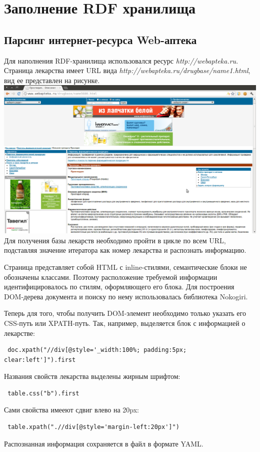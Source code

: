 \documentclass[specialist,subf,href,colorlinks=true
]{disser}
\begin{document}
\chapter{Заполнение RDF хранилища}
\section{Парсинг интернет-ресурса Web-аптека}
Для наполнения RDF-хранилища использовался ресурс \textit{http://webapteka.ru}. Страница лекарства имеет URL вида \textit{http://webapteka.ru/drugbase/name1.html}, вид ее представлен на рисунке.
\\ \includegraphics[width=160mm]{3.png}
\\Для получения базы лекарств необходимо пройти в цикле по всем URL, подставляя значение итератора как номер лекарства и распознать информацию.

Страница представляет собой HTML с inline-стилями, семантические блоки не обозначены классами. Поэтому расположение требуемой информации идентифицировалось по стилям, оформляющего его блока. Для построения DOM-дерева документа и поиску по нему использовалась библиотека Nokogiri.

Теперь для того, чтобы получить DOM-элемент необходимо только указать его CSS-путь или XPATH-путь. Так, например, выделяется блок с информацией о лекарстве:
\begin{lstlisting}
 doc.xpath("//div[@style='_width:100%; padding:5px; clear:left']").first
\end{lstlisting}
Названия свойств лекарства выделены жирным шрифтом:
\begin{lstlisting}
 table.css("b").first
\end{lstlisting}
Сами свойства имееют сдвиг влево на 20px:
\begin{lstlisting}
 table.xpath(".//div[@style='margin-left:20px']")
\end{lstlisting}
Распознанная информация сохраняется в файл в формате YAML.
\end{document}
